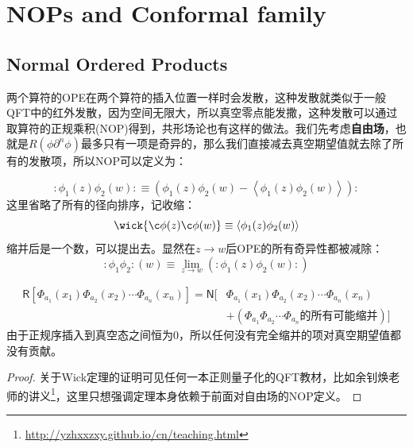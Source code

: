 \section{NOPs and Conformal family}
\subsection{Normal Ordered Products}
两个算符的OPE在两个算符的插入位置一样时会发散，这种发散就类似于一般QFT中的红外发散，因为空间无限大，所以真空零点能发撒，这种发散可以通过取算符的正规乘积(NOP)得到，共形场论也有这样的做法。我们先考虑\textbf{自由场}，也就是$R(\phi\partial^n\phi)$最多只有一项是奇异的，那么我们直接减去真空期望值就去除了所有的发散项，所以NOP可以定义为：
\begin{definition}[NOPs]
	\begin{equation}
		:\phi_1(z)\phi_2(w):\equiv\left(\phi_1(z)\phi_2(w)-\left\langle{\phi_1(z)\phi_2(w)}\right\rangle\right):
	\end{equation}
	这里省略了所有的径向排序，记收缩：
	\begin{equation}
		\wick{\c \phi(z)\c \phi(w)}\equiv \left\langle{\phi_1(z)\phi_2(w)}\right\rangle
	\end{equation}
	缩并后是一个数，可以提出去。显然在$z\to w$后OPE的所有奇异性都被减除：
	\begin{equation}
		:\phi_1\phi_2:(w)\equiv\lim_{z\to w}\left(:\phi_1(z)\phi_2(w):\right)
	\end{equation}
\end{definition}
\begin{theorem}[Wick]
	\begin{equation}
		\boxed{
			\begin{aligned}
				\mathsf R[\Phi_{a_1}(x_1)\Phi_{a_2}(x_2)\cdots\Phi_{a_n}(x_n)]=\mathsf N\big[&\Phi_{a_1}(x_1)\Phi_{a_2}(x_2)\cdots\Phi_{a_n}(x_n)\\&+\left(\Phi_{a_1}\Phi_{a_2}\cdots\Phi_{a_n}\text{的所有可能缩并}\right)\big]
			\end{aligned}
		}
	\end{equation}
	由于正规序插入到真空态之间恒为0，所以任何没有完全缩并的项对真空期望值都没有贡献。
\end{theorem}
\begin{proof}
	关于Wick定理的证明可见任何一本正则量子化的QFT教材，比如余钊焕老师的讲义\footnote{\url{http://yzhxxzxy.github.io/cn/teaching.html}}，这里只想强调定理本身依赖于前面对自由场的NOP定义。
\end{proof}
